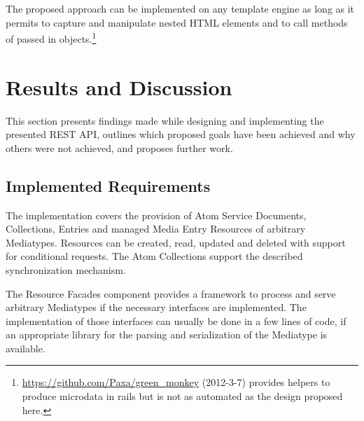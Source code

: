 \documentclass[11pt,a4paper,headsepline,twoside]{scrartcl}		%
\newcommand{\citeurl}[2]{\url{#1} (#2)}
\begin{document}
The proposed approach can be implemented on any template engine as long as it
permits to capture and manipulate nested HTML elements and to call methods of
passed in
objects.\footnote{\citeurl{https://github.com/Paxa/green_monkey}{2012-3-7}
  provides helpers to produce microdata in rails but is not as automated as the
  design proposed here.}






\section{Results and Discussion}
\label{sec:results-discussion}

This section presents findings made while designing and implementing the
presented REST API, outlines which proposed goals have been achieved and why
others were not achieved, and proposes further work.

\subsection{Implemented Requirements}
\label{sec:impl-requ}

The implementation covers the provision of Atom Service Documents, Collections,
Entries and managed Media Entry Resources of arbitrary Mediatypes. Resources can
be created, read, updated and deleted with support for conditional requests. The
Atom Collections support the described synchronization mechanism.

The Resource Facades component provides a framework to process and serve
arbitrary Mediatypes if the necessary interfaces are implemented. The
implementation of those interfaces can usually be done in a few lines of code,
if an appropriate library for the parsing and serialization of the Mediatype is
available.
\end{document}
